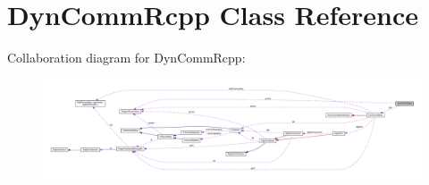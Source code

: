 \hypertarget{classDynCommRcpp}{}\section{Dyn\+Comm\+Rcpp Class Reference}
\label{classDynCommRcpp}


Collaboration diagram for Dyn\+Comm\+Rcpp\+:
\nopagebreak
\begin{figure}[H]
\begin{center}
\leavevmode
\includegraphics[width=350pt]{classDynCommRcpp__coll__graph}
\end{center}
\end{figure}
